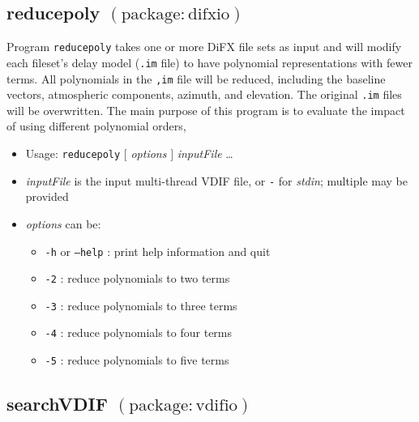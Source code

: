
\subsection{reducepoly {\small $\mathrm{(package: difxio)}$}} \label{sec:reducepoly}

Program {\tt reducepoly} takes one or more DiFX file sets as input and will modify each fileset's delay model ({\tt .im} file) to have polynomial representations with fewer terms.
All polynomials in the {\tt ,im} file will be reduced, including the baseline vectors, atmospheric components, azimuth, and elevation.
The original {\tt .im} files will be overwritten.
The main purpose of this program is to evaluate the impact of using different polynomial orders,

\begin{itemize}
\item[] Usage: {\tt reducepoly} $ [ $ {\em options} $ ] $ {\em inputFile} \ldots
\item[] {\em inputFile} is the input multi-thread VDIF file, or {\tt -} for {\em stdin}; multiple may be provided
\item[] {\em options} can be:
\begin{itemize}
\item[] {\tt -h} or {\tt --help} : print help information and quit
\item[] {\tt -2} : reduce polynomials to two terms
\item[] {\tt -3} : reduce polynomials to three terms
\item[] {\tt -4} : reduce polynomials to four terms
\item[] {\tt -5} : reduce polynomials to five terms
\end{itemize}
\end{itemize}







\subsection{searchVDIF {\small $\mathrm{(package: vdifio)}$}} \label{sec:searchVDIF}




